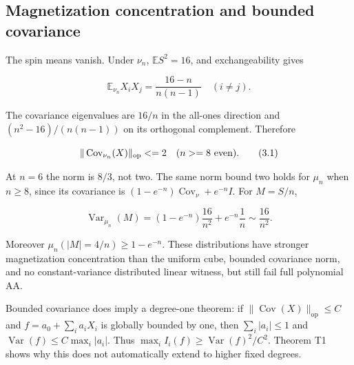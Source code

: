\subsection{Magnetization concentration and bounded
covariance}\label{proof:thin_shell_obstruction:magnetization-concentration-and-bounded-covariance}

The spin means vanish. Under \(\nu _n\), \(\mathbb{E} S^{2}=16\), and
exchangeability gives

\[
\mathbb E_{\nu_n}X_iX_j=\frac{16-n}{n(n-1)}\quad(i\ne j).
\]

The covariance eigenvalues are \(16/n\) in the all-ones direction and
\((n^{2}-16)/(n(n-1))\) on its orthogonal complement. Therefore

\[
\|\operatorname{Cov}_{\nu_n}(X)\|_{\rm op}\le2\quad(n\ge8\text{ even}).
\tag{3.1}
\]

At \(n=6\) the norm is \(8/3\), not two. The same norm bound two holds
for \(\mu _n\) when \(n\ge 8\), since its covariance is
\((1-e^{-n})\operatorname{Cov}_\nu +e^{-n}I\). For \(M=S/n\),

\[
\operatorname{Var}_{\mu_n}(M)=(1-e^{-n})\frac{16}{n^2}+e^{-n}\frac1n
\sim\frac{16}{n^2}.
\tag{3.2}
\]

Moreover \(\mu _n(|M|=4/n)\ge 1-e^{-n}\). These distributions have
stronger magnetization concentration than the uniform cube, bounded
covariance norm, and no constant-variance distributed linear witness,
but still fail full polynomial AA.

Bounded covariance does imply a degree-one theorem: if
\(\lVert \operatorname{Cov}(X)\rVert_{\mathrm{op}}\le C\) and
\(f=a_{0}+\sum_i a_iX_i\) is globally bounded by one, then
\(\sum_i|a_i|\le 1\) and \(\operatorname{Var}(f)\le C \max _i|a_i|\).
Thus \(\max _i I_i(f)\ge \operatorname{Var}(f)^{2}/C^{2}\). Theorem T1
shows why this does not automatically extend to higher fixed degrees.
